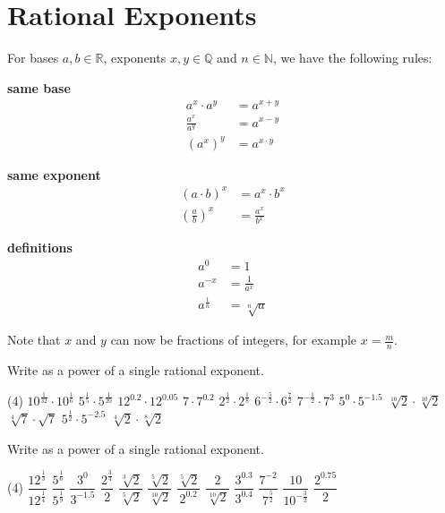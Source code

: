 \section{Rational Exponents}
\begin{tcolorbox}
	For bases $a,b\in\mathbb R$, exponents $x,y\in\mathbb Q$ and $n\in\mathbb N$, we have the following rules:
	\begin{multicols}{3}
		\centering
		\textbf{same base}\\
		\begin{align*}
			a^x\cdot a^y&=a^{x+y} \\[8pt]
			\frac{a^x}{a^y}&=a^{x-y} \\[8pt]
			\left(a^x\right)^y&=a^{x\cdot y}
		\end{align*}
		\vfill
		\columnbreak
		
		\textbf{same exponent}\\
		\begin{align*}
			\left(a\cdot b\right)^x&=a^x\cdot b^x \\[8pt]
			\left(\frac{a}{b}\right)^x&=\frac{a^x}{b^x}
		\end{align*}
		\vfill
		\columnbreak
		
		\textbf{definitions}\\
		\begin{align*}
			a^0&=1 \\[8pt]
			a^{-x}&=\frac{1}{a^x} \\[8pt]
			a^{\frac{1}{n}}&=\sqrt[n]{a}
		\end{align*}
		\vfill
	\end{multicols}
	Note that $x$ and $y$ can now be fractions of integers, for example $x=\frac{m}{n}$.
\end{tcolorbox}
\begin{exercise}
	Write as a power of a single rational exponent.
	\begin{tasks}(4)
		\task $10^\frac{1}{32}\cdot 10^\frac{1}{6}$
		\task $5^\frac{1}{5}\cdot 5^\frac{1}{20}$
		\task $12^{0.2}\cdot 12^{0.05}$
		\task $7\cdot 7^{0.2}$
		\task $2^\frac{1}{2}\cdot 2^\frac{1}{8}$
		\task $6^{-\frac{5}{2}}\cdot 6^\frac{7}{2}$
		\task $7^{-\frac{1}{2}}\cdot 7^3$
		\task $5^0\cdot 5^{-1.5}$
		\task $\sqrt[10]{2}\cdot\sqrt[10]{2}$
		\task $\sqrt[4]{7}\cdot\sqrt{7}$
		\task $5^{\frac{1}{2}}\cdot 5^{-2.5}$
		\task $\sqrt[4]{2}\cdot\sqrt[8]{2}$
	\end{tasks}
\end{exercise}
\begin{exercise}
	Write as a power of a single rational exponent.
	\begin{tasks}(4)
		\task $\dfrac{12^\frac{1}{3}}{12^\frac{1}{4}}$
		\task $\dfrac{5^{\frac{1}{6}}}{5^\frac{1}{9}}$
		\task $\dfrac{3^0}{3^{-1.5}}$
		\task $\dfrac{2^{\frac{3}{4}}}{2}$
		\task $\dfrac{\sqrt[3]{2}}{\sqrt[5]{2}}$
		\task $\dfrac{\sqrt[5]{2}}{\sqrt[10]{2}}$
		\task $\dfrac{\sqrt[5]{2}}{2^{0.2}}$
		\task $\dfrac{2}{\sqrt[10]{2}}$
		\task $\dfrac{3^{0.3}}{3^{0.4}}$
		\task $\dfrac{7^{-2}}{7^\frac{5}{2}}$
		\task $\dfrac{10}{10^{-\frac{3}{2}}}$
		\task $\dfrac{2^{0.75}}{2}$
	\end{tasks}
\end{exercise}
